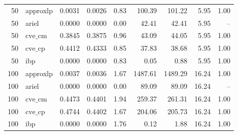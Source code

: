 \documentclass{article}
\begin{document}
\begin{table}[ht]
\begin{tabular}{rlrrrrrrr}
\hline
 50 & approxlp & 0.0031 & 0.0026 & 0.83 & 100.39 & 101.22 & 5.95 & 1.00 \\
 50 & ariel & 0.0000 & 0.0000 & 0.00 & 42.41 & 42.41 & 5.95 & -- \\
 50 & $\text{cve\_cm}$ & 0.3845 & 0.3875 & 0.96 & 43.09 & 44.05 & 5.95 & 1.00 \\
 50 & $\text{cve\_cp}$ & 0.4412 & 0.4333 & 0.85 & 37.83 & 38.68 & 5.95 & 1.00 \\
 50 & ibp & 0.0000 & 0.0000 & 0.83 & 0.05 & 0.88 & 5.95 & 1.00 \\
\hline
 100 & approxlp & 0.0037 & 0.0036 & 1.67 & 1487.61 & 1489.29 & 16.24 & 1.00 \\
 100 & ariel & 0.0000 & 0.0000 & 0.00 & 89.09 & 89.09 & 16.24 & -- \\
 100 & $\text{cve\_cm}$ & 0.4473 & 0.4401 & 1.94 & 259.37 & 261.31 & 16.24 & 1.00 \\
 100 & $\text{cve\_cp}$ & 0.4744 & 0.4402 & 1.67 & 204.06 & 205.73 & 16.24 & 1.00 \\
 100 & ibp & 0.0000 & 0.0000 & 1.76 & 0.12 & 1.88 & 16.24 & 1.00 \\
\bottomrule
\end{tabular}
\end{table}
\end{document}
